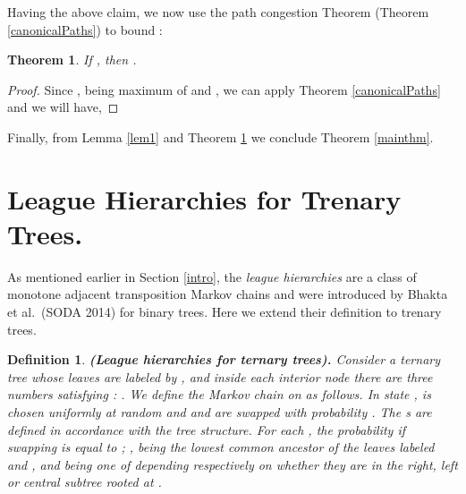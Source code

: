\documentclass[10 pt]{article}
\newtheorem{defin}{Definition}[section]
\newtheorem{thm}{Theorem}[section]
\begin{document}
Having the above claim, we now use the path congestion Theorem (Theorem \ref{canonicalPaths}) to bound :
 \begin{thm}\label{big}
If , then . 
\end{thm}
\begin{proof}

Since ,  being maximum of  and , we can  apply Theorem \ref{canonicalPaths} and we will have,




\end{proof}


Finally, from Lemma \ref{lem1} and Theorem \ref{big} we conclude Theorem \ref{mainthm}.

\section{League Hierarchies for Trenary Trees.}\label{trees}
 
As mentioned earlier in Section \ref{intro}, the \emph{league hierarchies} are a class of monotone adjacent transposition Markov chains and
were introduced by Bhakta et al.\ (SODA 2014) \cite{Dana} for binary trees. Here we extend their definition to trenary trees. 
   
\begin{defin}\textbf{(League hierarchies for ternary trees).} \label{LeagueHiDef}
Consider a ternary tree whose leaves are labeled by , and inside each interior node  there are three numbers
 satisfying :
.
We define the Markov chain  on  as follows.  In state ,  is chosen uniformly at random and
 and  are swapped with probability . The s are defined in accordance with
the tree structure.  For each  , the probability if swapping  is equal to ; , 
being the lowest common ancestor of the leaves labeled   and , and  being one of  depending respectively on whether
they are in the right, left or central subtree rooted at .
 \end{defin}
 
\end{document}
